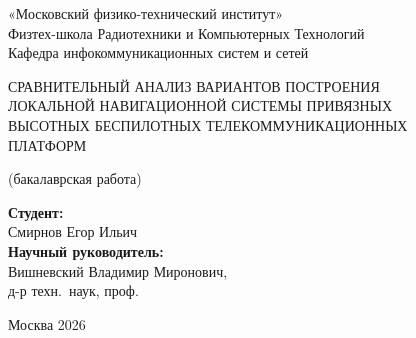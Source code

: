 \documentclass[10pt]{beamer}
\begin{document}
\begin{frame}[plain]
\begin{center}
{\footnotesize
«Московский физико-технический институт»\\
Физтех-школа Радиотехники и Компьютерных Технологий\\
Кафедра инфокоммуникационных систем и сетей
}
\end{center}

\medskip

\vfill

\begin{center}
{
СРАВНИТЕЛЬНЫЙ АНАЛИЗ ВАРИАНТОВ ПОСТРОЕНИЯ\\
ЛОКАЛЬНОЙ НАВИГАЦИОННОЙ СИСТЕМЫ ПРИВЯЗНЫХ\\
ВЫСОТНЫХ БЕСПИЛОТНЫХ ТЕЛЕКОММУНИКАЦИОННЫХ\\
ПЛАТФОРМ}

\medskip

(бакалаврская работа)
\end{center}

\vfill

\hfill\begin{minipage}{0.62\textwidth}
{\footnotesize
\textbf{Студент:}\\
Смирнов Егор Ильич\\[0.9em]
\textbf{Научный руководитель:}\\
Вишневский Владимир Миронович,\\
д-р техн.\ наук, проф.
}
\end{minipage}

\vfill

\begin{center}
Москва 2026
\end{center}
\end{frame}
\end{document}
